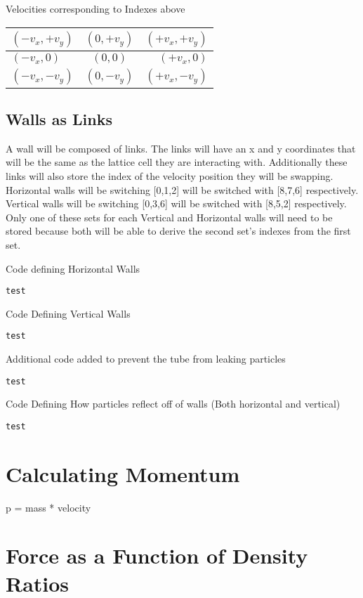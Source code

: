 \documentclass{article}
\begin{document}
\begin{center}
Velocities corresponding to Indexes above ~
\begin{tabular}{l c r}
	\hline
	$(-v_x,+v_y)$ & $(0,+v_y)$ & $(+v_x,+v_y)$ \\ \hline
	$(-v_x,0)$ & $(0,0)$ & $(+v_x,0)$ \\ \hline
	$(-v_x,-v_y)$ & $(0,-v_y)$ & $(+v_x,-v_y)$ \\ 
	\hline
\end{tabular}
\end{center}

\subsection{Walls as Links}
A wall will be composed of links. The links will have an x and y coordinates that will be the same as the lattice cell they are interacting with. Additionally these links will also store the index of the velocity position they will be swapping. Horizontal walls will be switching [0,1,2] will be switched with [8,7,6] respectively. Vertical walls will be switching [0,3,6] will be switched with [8,5,2] respectively. Only one of these sets for each Vertical and Horizontal walls will need to be stored because both will be able to derive the second set's indexes from the first set. 

Code defining Horizontal Walls 
\begin{verbatim}
test
\end{verbatim}

Code Defining Vertical Walls
\begin{verbatim}
test
\end{verbatim}

Additional code added to prevent the tube from leaking particles
\begin{verbatim}
test
\end{verbatim}

Code Defining How particles reflect off of walls (Both horizontal and vertical)
\begin{verbatim}
test
\end{verbatim}

\section{Calculating Momentum}
 p = mass * velocity
\section{Force as a Function of Density Ratios}
\end{document}
